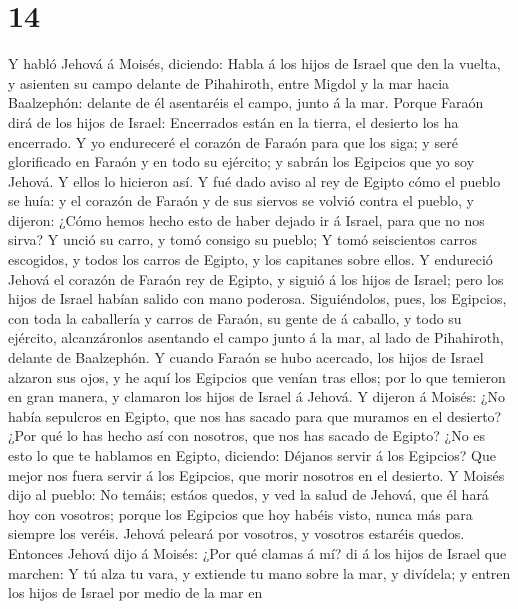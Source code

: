 \hypertarget{section-13}{%
\section{14}\label{section-13}}

 Y habló Jehová á Moisés, diciendo:  Habla á los
hijos de Israel que den la vuelta, y asienten su campo delante de
Pihahiroth, entre Migdol y la mar hacia Baalzephón: delante de él
asentaréis el campo, junto á la mar.  Porque Faraón dirá de
los hijos de Israel: Encerrados están en la tierra, el desierto los ha
encerrado.  Y yo endureceré el corazón de Faraón para que
los siga; y seré glorificado en Faraón y en todo su ejército; y sabrán
los Egipcios que yo soy Jehová. Y ellos lo hicieron así.  Y
fué dado aviso al rey de Egipto cómo el pueblo se huía: y el corazón de
Faraón y de sus siervos se volvió contra el pueblo, y dijeron: ¿Cómo
hemos hecho esto de haber dejado ir á Israel, para que no nos sirva?
 Y unció su carro, y tomó consigo su pueblo;  Y
tomó seiscientos carros escogidos, y todos los carros de Egipto, y los
capitanes sobre ellos.  Y endureció Jehová el corazón de
Faraón rey de Egipto, y siguió á los hijos de Israel; pero los hijos de
Israel habían salido con mano poderosa.  Siguiéndolos, pues,
los Egipcios, con toda la caballería y carros de Faraón, su gente de á
caballo, y todo su ejército, alcanzáronlos asentando el campo junto á la
mar, al lado de Pihahiroth, delante de Baalzephón.  Y
cuando Faraón se hubo acercado, los hijos de Israel alzaron sus ojos, y
he aquí los Egipcios que venían tras ellos; por lo que temieron en gran
manera, y clamaron los hijos de Israel á Jehová.  Y dijeron
á Moisés: ¿No había sepulcros en Egipto, que nos has sacado para que
muramos en el desierto? ¿Por qué lo has hecho así con nosotros, que nos
has sacado de Egipto?  ¿No es esto lo que te hablamos en
Egipto, diciendo: Déjanos servir á los Egipcios? Que mejor nos fuera
servir á los Egipcios, que morir nosotros en el desierto. 
Y Moisés dijo al pueblo: No temáis; estáos quedos, y ved la salud de
Jehová, que él hará hoy con vosotros; porque los Egipcios que hoy habéis
visto, nunca más para siempre los veréis.  Jehová peleará
por vosotros, y vosotros estaréis quedos.  Entonces Jehová
dijo á Moisés: ¿Por qué clamas á mí? di á los hijos de Israel que
marchen:  Y tú alza tu vara, y extiende tu mano sobre la
mar, y divídela; y entren los hijos de Israel por medio de la mar en
